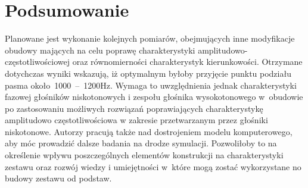 \documentclass[12pt]{oska}
\newcommand{\range}[2]{\num{#1}~--~\num{#2}}
\begin{document}
\section{Podsumowanie}
	
	
		Planowane jest wykonanie kolejnych pomiarów, obejmujących inne modyfikacje obudowy mających na celu poprawę charakterystyki amplitudowo-częstotliwościowej oraz równomierności charakterystyk kierunkowości. Otrzymane dotychczas wyniki wskazują, iż optymalnym byłoby przyjęcie punktu podziału pasma około~\range{1000}{1200}\si{Hz}. Wymaga to uwzględnienia jednak charakterystyki fazowej głośników niskotonowych i zespołu głośnika wysokotonowego w~obudowie po zastosowaniu możliwych rozwiązań poprawiających charakterystykę amplitudowo częstotliwościowa w zakresie przetwarzanym przez głośniki niskotonowe. Autorzy pracują także nad dostrojeniem modelu komputerowego, aby móc prowadzić dalsze badania na drodze symulacji. Pozwoliłoby to na określenie wpływu poszczególnych elementów konstrukcji na charakterystyki zestawu oraz rozwój wiedzy i umiejętności w~które mogą zostać wykorzystane no budowy zestawu od podstaw. 
		
\printbibliography
\end{document}
